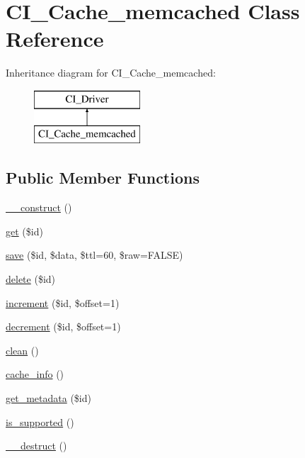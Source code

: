 \hypertarget{class_c_i___cache__memcached}{}\section{C\+I\+\_\+\+Cache\+\_\+memcached Class Reference}
\label{class_c_i___cache__memcached}
Inheritance diagram for C\+I\+\_\+\+Cache\+\_\+memcached\+:\begin{figure}[H]
\begin{center}
\leavevmode
\includegraphics[height=2.000000cm]{class_c_i___cache__memcached}
\end{center}
\end{figure}
\subsection*{Public Member Functions}
\begin{DoxyCompactItemize}
\item 
\mbox{\hyperlink{class_c_i___cache__memcached_a095c5d389db211932136b53f25f39685}{\+\_\+\+\_\+construct}} ()
\item 
\mbox{\hyperlink{class_c_i___cache__memcached_a50e3bfb586b2f42932a6a93f3fbb0828}{get}} (\$id)
\item 
\mbox{\hyperlink{class_c_i___cache__memcached_a472645db04a8ce4b040b789a3062a7d2}{save}} (\$id, \$data, \$ttl=60, \$raw=F\+A\+L\+SE)
\item 
\mbox{\hyperlink{class_c_i___cache__memcached_a2f8258add505482d7f00ea26493a5723}{delete}} (\$id)
\item 
\mbox{\hyperlink{class_c_i___cache__memcached_a2f07a4e09b57f4460d49852497d1808f}{increment}} (\$id, \$offset=1)
\item 
\mbox{\hyperlink{class_c_i___cache__memcached_a4eb1c2772c8efc48c411ea060dd040b7}{decrement}} (\$id, \$offset=1)
\item 
\mbox{\hyperlink{class_c_i___cache__memcached_adb40b812890a8bc058bf6b7a0e1a54d9}{clean}} ()
\item 
\mbox{\hyperlink{class_c_i___cache__memcached_acb4742926a6fa901e4f0917e1a35ef4c}{cache\+\_\+info}} ()
\item 
\mbox{\hyperlink{class_c_i___cache__memcached_a59635cf18e997c5141bffa05ff7622e0}{get\+\_\+metadata}} (\$id)
\item 
\mbox{\hyperlink{class_c_i___cache__memcached_a98c68fd153468bc148c4ed8c716859fc}{is\+\_\+supported}} ()
\item 
\mbox{\hyperlink{class_c_i___cache__memcached_a421831a265621325e1fdd19aace0c758}{\+\_\+\+\_\+destruct}} ()
\end{DoxyCompactItemize}
